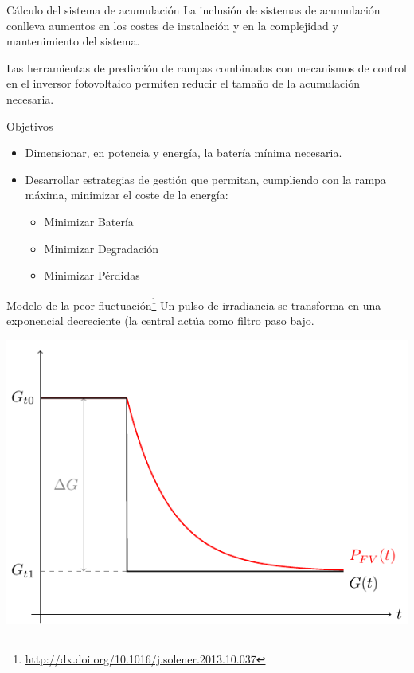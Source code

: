 \documentclass[aspectratio=169, usenames,svgnames,dvipsnames]{beamer}
\begin{document}
\begin{frame}[label={sec:org48a4cad}]{Cálculo del sistema de acumulación}
La inclusión de sistemas de acumulación conlleva \alert{aumentos en los
costes} de instalación y en la \alert{complejidad y mantenimiento} del
sistema.

Las herramientas de \alert{predicción} de rampas combinadas con \alert{mecanismos de
control en el inversor} fotovoltaico permiten \alert{reducir} el tamaño de la
acumulación necesaria.

\begin{block}{Objetivos}
\begin{itemize}
\item Dimensionar, en \alert{potencia y energía}, la batería mínima necesaria.
\item \alert{Desarrollar estrategias de gestión} que permitan, cumpliendo con la rampa máxima, minimizar el coste de la energía:
\begin{itemize}
\item Minimizar Batería
\item Minimizar Degradación
\item Minimizar Pérdidas
\end{itemize}
\end{itemize}
\end{block}
\end{frame}

\begin{frame}[label={sec:orge5ffdcb}]{Modelo de la peor fluctuación\footnote{\url{http://dx.doi.org/10.1016/j.solener.2013.10.037}}}
Un pulso de irradiancia se transforma en una exponencial decreciente (la central actúa como filtro paso bajo.

\begin{center}
\includegraphics[height=0.7\textheight]{../figs/ModeloPeorFluctuacion0.pdf}
\end{center}
\end{frame}
\end{document}
